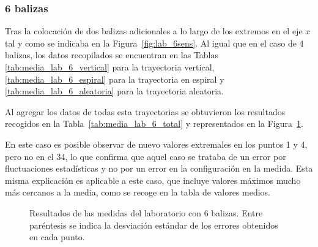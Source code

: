 
\subsubsection{6 balizas}
Tras la colocación de dos balizas adicionales a lo largo de los extremos en el eje $x$ tal y como se indicaba en la Figura~\ref{fig:lab_6sens}.
Al igual que en el caso de 4 balizas, los datos recopilados se encuentran en las Tablas \ref{tab:media_lab_6_vertical} para la trayectoria vertical, \ref{tab:media_lab_6_espiral} para la trayectoria en espiral y \ref{tab:media_lab_6_aleatoria} para la trayectoria aleatoria.

Al agregar los datos de todas esta trayectorias se obtuvieron los resultados recogidos en la Tabla~\ref{tab:media_lab_6_total} y representados en la Figura~\ref{fig:res_lab}.

En este caso es posible observar de nuevo valores extremales en los puntos 1 y 4, pero no en el 34, lo que confirma que aquel caso se trataba de un error por fluctuaciones estadísticas y no por un error en la configuración en la medida.
Esta misma explicación es aplicable a este caso, que incluye valores máximos mucho más cercanos a la media, como se recoge en la tabla de valores medios.

\begin{figure}[H]
    \centering
    
    \caption{Resultados de las medidas del laboratorio con 6 balizas. Entre paréntesis se indica la desviación estándar de los errores obtenidos en cada punto.}
    \label{fig:res_lab}
\end{figure}


